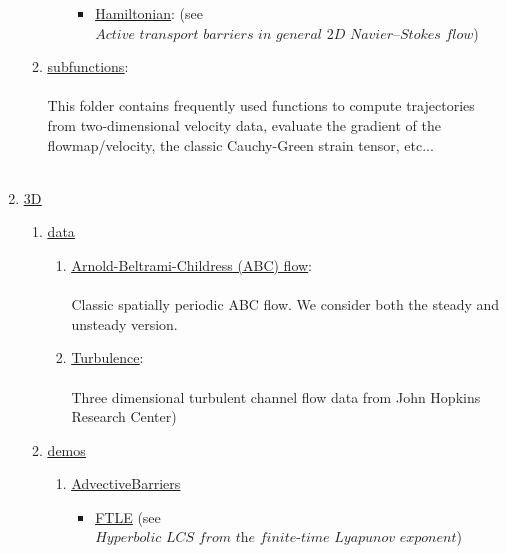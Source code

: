 \documentclass{article}
\begin{document}
\begin{enumerate}
\begin{enumerate}
\begin{enumerate}
\begin{itemize}
\item \href{https://github.com/EncinasBartos/TBarrier/tree/main/TBarrier/2D/demos/ActiveBarriers/Hamiltonian}{\underline{Hamiltonian}}: (see $ \textit{Active transport barriers in general 2D Navier–Stokes flow} $)\\
\end{itemize}
\end{enumerate}
\item \href{https://github.com/EncinasBartos/TBarrier/tree/main/TBarrier/2D/subfunctions}{\underline{subfunctions}}: \\ \\
This folder contains frequently used functions to compute trajectories from two-dimensional velocity data, evaluate the gradient of the flowmap/velocity, the classic Cauchy-Green strain tensor, etc... \\ \\
\end{enumerate}
\item  \href{https://github.com/EncinasBartos/TBarrier/tree/main/TBarrier/3D}{\underline{3D}}
\begin{enumerate}
 \item \href{https://github.com/EncinasBartos/TBarrier/tree/main/TBarrier/3D/data}{\underline{data}}
 \begin{enumerate}
 \item \href{https://github.com/EncinasBartos/TBarrier/tree/main/TBarrier/3D/data/ABC}{\underline{Arnold-Beltrami-Childress (ABC) flow}}: \\ \\
 Classic spatially periodic ABC flow. We consider both the steady and unsteady version.
 \item \href{https://github.com/EncinasBartos/TBarrier/tree/main/TBarrier/3D/data/Turbulence}{\underline{Turbulence}}: \\ \\
 Three dimensional turbulent channel flow data from John Hopkins Research Center)
 \end{enumerate}
  \item \href{https://github.com/EncinasBartos/TBarrier/tree/main/TBarrier/3D/demos}{\underline{demos}}
\begin{enumerate}
 \item \href{https://github.com/EncinasBartos/TBarrier/tree/main/TBarrier/3D/demos/AdvectiveBarriers}{\underline{AdvectiveBarriers}} \\
  \begin{itemize}
  \item \href{https://github.com/EncinasBartos/TBarrier/tree/main/TBarrier/3D/demos/AdvectiveBarriers/FTLE}{\underline{FTLE}} (see $ \textit{Hyperbolic LCS from the finite-time Lyapunov exponent} $) \\ \\

\end{itemize}
\end{enumerate}
\end{enumerate}
\end{enumerate}
\end{document}
